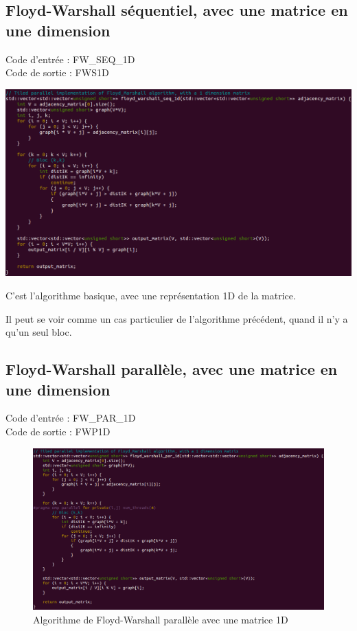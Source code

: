 \documentclass[a4paper,11pt]{article}
\begin{document}
\subsection{Floyd-Warshall séquentiel, avec une matrice en une dimension}

\noindent Code d'entrée : FW\_SEQ\_1D \\
Code de sortie : FWS1D

\begin{center}
  \includegraphics[scale=0.6]{FW_SEQ_1D.png}
\end{center}

C'est l'algorithme basique, avec une représentation 1D de la matrice.

Il peut se voir comme un cas particulier de l'algorithme précédent, quand il n'y a qu'un seul bloc.

\subsection{Floyd-Warshall parallèle, avec une matrice en une dimension}

\noindent Code d'entrée : FW\_PAR\_1D \\
Code de sortie : FWP1D

\begin{figure}[H]
\begin{center}
  \includegraphics[scale=0.6]{FW_PAR_1D.png}
  \caption{Algorithme de Floyd-Warshall parallèle avec une matrice 1D}
\end{center}
\end{figure}
\end{document}
